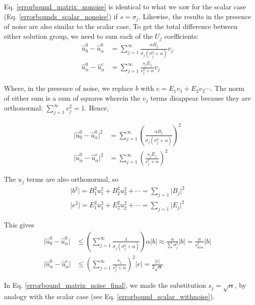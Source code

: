 \documentclass[]{article}
\newcommand{\norm}[1]{\lvert #1 \rvert}
\begin{document}
{Eq. \ref{errorbound_matrix_nonoise} is identical to what we saw for the scalar case (Eq. \ref{errorbounds_scalar_nonoise}) if $s = \sigma_{j}$. Likewise, the results in the presence of noise are also similar to the scalar case. To get the total difference between either solution group, we need to sum each of the $U_{j}$ coefficients:
\begin{align}
\hat{u}_{0}^{0} - \hat{u}_{\alpha}^{0} &= \sum_{j=1}^{\infty} \frac{\alpha B_{j}}{\sigma_{j}(\sigma_{j}^{2}+\alpha)} v_{j} \\
\hat{u}_{\alpha}^{0} - \hat{u}_{\alpha}^{e} &= \sum_{j=1}^{\infty} \frac{s_{j} E_{j}}{s_{j}^{2} + \alpha} v_{j}
\end{align}

Where, in the presence of noise, we replace $b$ with $e = E_{1}v_{1} + E_{2}v_{2} \dotsm$. The norm of either sum is a sum of squares wherein the $v_{j}$ terms disappear because they are orthonormal: $\sum_{j=1}^{\infty} v_{j}^{2} = 1$. Hence,

\begin{align}
\norm{\hat{u}_{0}^{0} - \hat{u}_{\alpha}^{0}}^{2} &= \sum_{j=1}^{\infty} \left(\frac{\alpha B_{j}}{\sigma_{j}(\sigma_{j}^{2}+\alpha)}\right)^{2} \\
\norm{\hat{u}_{\alpha}^{0} - \hat{u}_{\alpha}^{e}}^{2} &= \sum_{j=1}^{\infty} \left(\frac{s_{j} E_{j}}{s_{j}^{2} + \alpha}\right)^{2}
\end{align}

The $u_{j}$ terms are also orthonormal, so 
\begin{align*}
\norm{b^{2}} = B_{1}^{2}u_{1}^{2} + B_{2}^{2}u_{2}^{2} + \dotsm = \sum_{j=1} \norm{B_{j}}^{2} \\
\norm{e^{2}} = E_{1}^{2}u_{1}^{2} + E_{2}^{2}u_{2}^{2} + \dotsm = \sum_{j=1} \norm{E_{j}}^{2} 
\end{align*}

This gives
\begin{align}
\norm{\hat{u}_{0}^{0} - \hat{u}_{\alpha}^{0}} &\leq \left( \sum_{j=1}^{\infty} \frac{1}{\sigma_{j}(\sigma_{j}^{2}+\alpha)}\right) \alpha \norm{b} \approx \frac{\alpha}{\sum \sigma_{j}^{3}} \norm{b} = \frac{\alpha}{s_{min}^{3}} \norm{b} \\
\norm{\hat{u}_{\alpha}^{0} - \hat{u}_{\alpha}^{e}} &\leq \left(\sum_{j=1}^{\infty}\frac{s_{j}}{s_{j}^{2} + \alpha}\right)^{2} \norm{e} = \frac{\norm{e}}{2\sqrt{\alpha}} \label{errorbound_matrix_noise_final}
\end{align}

In Eq. \ref{errorbound_matrix_noise_final}, we made the substitution $s_{j} = \sqrt{\alpha}$, by analogy with the scalar case (see Eq. \ref{errorbound_scalar_withnoise}). 

}
\end{document}
